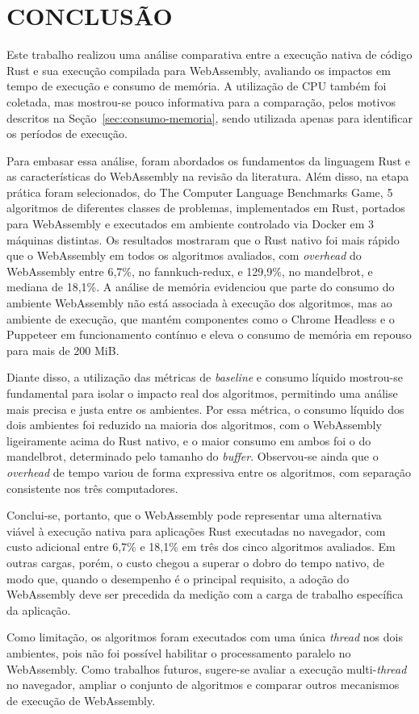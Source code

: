\chapter{CONCLUSÃO}

Este trabalho realizou uma análise comparativa entre a execução nativa de código Rust e sua execução compilada para WebAssembly, avaliando os impactos em tempo de execução e consumo de memória. A utilização de CPU também foi coletada, mas mostrou-se pouco informativa para a comparação, pelos motivos descritos na Seção~\ref{sec:consumo-memoria}, sendo utilizada apenas para identificar os períodos de execução.

Para embasar essa análise, foram abordados os fundamentos da linguagem Rust e as características do WebAssembly na revisão da literatura. Além disso, na etapa prática foram selecionados, do The Computer Language Benchmarks Game, 5 algoritmos de diferentes classes de problemas, implementados em Rust, portados para WebAssembly e executados em ambiente controlado via Docker em 3 máquinas distintas. Os resultados mostraram que o Rust nativo foi mais rápido que o WebAssembly em todos os algoritmos avaliados, com \emph{overhead} do WebAssembly entre 6,7\%, no fannkuch-redux, e 129,9\%, no mandelbrot, e mediana de 18,1\%. A análise de memória evidenciou que parte do consumo do ambiente WebAssembly não está associada à execução dos algoritmos, mas ao ambiente de execução, que mantém componentes como o Chrome Headless e o Puppeteer em funcionamento contínuo e eleva o consumo de memória em repouso para mais de 200 MiB.

Diante disso, a utilização das métricas de \emph{baseline} e consumo líquido mostrou-se fundamental para isolar o impacto real dos algoritmos, permitindo uma análise mais precisa e justa entre os ambientes. Por essa métrica, o consumo líquido dos dois ambientes foi reduzido na maioria dos algoritmos, com o WebAssembly ligeiramente acima do Rust nativo, e o maior consumo em ambos foi o do mandelbrot, determinado pelo tamanho do \emph{buffer}. Observou-se ainda que o \emph{overhead} de tempo variou de forma expressiva entre os algoritmos, com separação consistente nos três computadores.

Conclui-se, portanto, que o WebAssembly pode representar uma alternativa viável à execução nativa para aplicações Rust executadas no navegador, com custo adicional entre 6,7\% e 18,1\% em três dos cinco algoritmos avaliados. Em outras cargas, porém, o custo chegou a superar o dobro do tempo nativo, de modo que, quando o desempenho é o principal requisito, a adoção do WebAssembly deve ser precedida da medição com a carga de trabalho específica da aplicação.

Como limitação, os algoritmos foram executados com uma única \emph{thread} nos dois ambientes, pois não foi possível habilitar o processamento paralelo no WebAssembly. Como trabalhos futuros, sugere-se avaliar a execução multi-\emph{thread} no navegador, ampliar o conjunto de algoritmos e comparar outros mecanismos de execução de WebAssembly.
